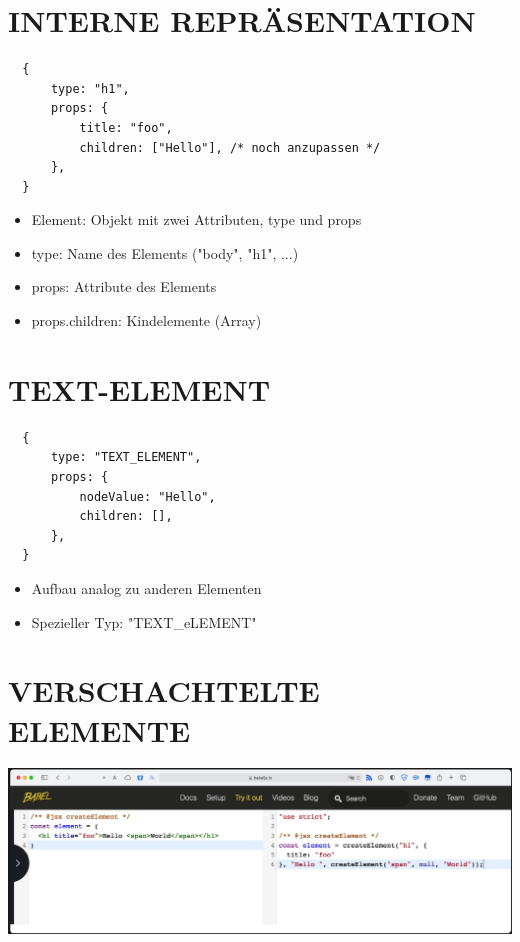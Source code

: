   \section*{INTERNE REPRÄSENTATION}
  \begin{verbatim}
  {
      type: "h1",
      props: {
          title: "foo",
          children: ["Hello"], /* noch anzupassen */
      },
  }
  \end{verbatim}
  
  \begin{itemize}
    \item Element: Objekt mit zwei Attributen, type und props
    \item type: Name des Elements ("body", "h1", ...)
    \item props: Attribute des Elements
    \item props.children: Kindelemente (Array)
  \end{itemize}
  
  \section*{TEXT-ELEMENT}
  \begin{verbatim}
  {
      type: "TEXT_ELEMENT",
      props: {
          nodeValue: "Hello",
          children: [],
      },
  }
  \end{verbatim}
  
  \begin{itemize}
    \item Aufbau analog zu anderen Elementen
    \item Spezieller Typ: "TEXT\_eLEMENT"
  \end{itemize}
  
  \section*{VERSCHACHTELTE ELEMENTE}
  \begin{center}
  \includegraphics[width=\linewidth]{images/2025_01_02_254b5e4c52d090c313e1g-11}
  \end{center}
  
